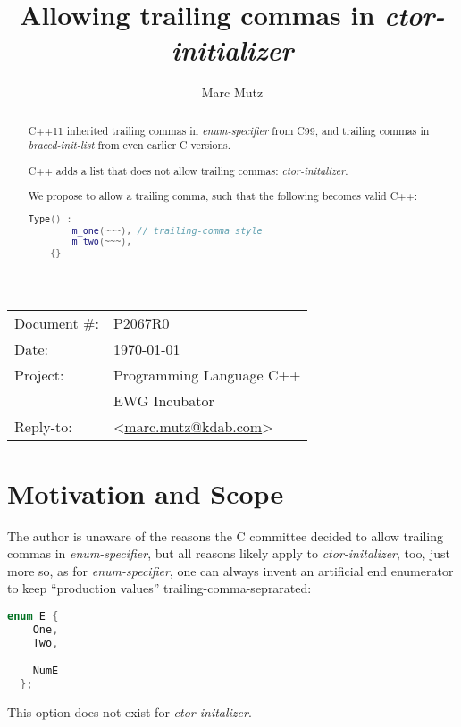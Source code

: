 \documentclass[11pt]{article}
\date{}
\title{Allowing trailing commas in \emph{ctor-initializer}}
\makeatletter
\newcommand{\emailaddress}{marc.mutz@kdab.com}
\newcommand{\email}{\href{mailto:\emailaddress}{\emailaddress}}
\makeatother
\begin{document}
\maketitle\vspace{-2cm}

\begin{tabular}{ll}
  Document \#:&P2067R0\\
  Date:       &\today\\
  Project:    &Programming Language C++\\
              &EWG Incubator\\
  Reply-to:   &\author{Marc Mutz} \textless\email\textgreater
\end{tabular}
\vspace{1cm}
\begin{abstract}
  C++11 inherited trailing commas in \emph{enum-specifier} from C99,
  and trailing commas in \emph{braced-init-list} from even earlier C
  versions.

  C++ adds a list that does not allow trailing commas:
  \emph{ctor-initalizer}.

  We propose to allow a trailing comma, such that the following becomes valid C++:

  \begin{lstlisting}[language=C++]
    Type() :
        m_one(~~~), // trailing-comma style
        m_two(~~~),
    {}
  \end{lstlisting}
\end{abstract}



\section{Motivation and Scope}

The author is unaware of the reasons the C committee decided to allow
trailing commas in \emph{enum-specifier}, but all reasons likely apply
to \emph{ctor-initalizer}, too, just more so, as for
\emph{enum-specifier}, one can always invent an artificial end
enumerator to keep ``production values'' trailing-comma-seprarated:

\begin{lstlisting}[language=C++]
  enum E {
    One,
    Two,

    NumE
  };
\end{lstlisting}

This option does not exist for \emph{ctor-initalizer}.
\end{document}

